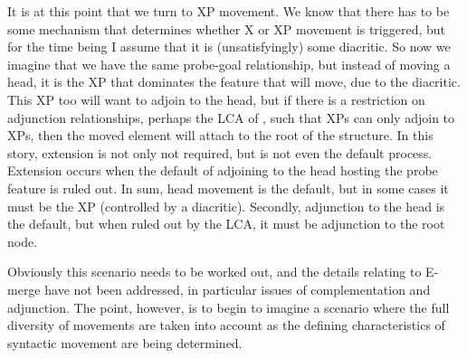 \documentclass[output=paper,colorlinks,citecolor=brown,
]{langscibook}
\begin{document}
It is at this point that we turn to XP movement.  We know that there has to be some mechanism that determines whether X or XP movement is triggered, but for the time being I assume that it is (unsatisfyingly) some diacritic. So now we imagine that we have the same probe-goal relationship, but instead of moving a head, it is the XP that dominates the feature that will move, due to the diacritic. This XP too will want to adjoin to the head, but if there is a restriction on adjunction relationships, perhaps the LCA of \citet{Kayne:1994}, such that XPs can only adjoin to XPs, then the moved element will attach to the root of the structure.  In this story, extension is not only not required, but is not even the default process.  Extension occurs when the default of adjoining to the head hosting the probe feature is ruled out.  In sum, head movement is the default, but in some cases it must be the XP (controlled by a diacritic).  Secondly, adjunction to the head is the default, but when ruled out by the LCA, it must be adjunction to the root node.

Obviously this scenario needs to be worked out, and the details relating to E-merge have not been addressed,  in particular issues of complementation and adjunction.  The point, however, is to begin to imagine a scenario where the full diversity of movements are taken into account as the defining characteristics of syntactic movement are being determined. 



\end{document}
